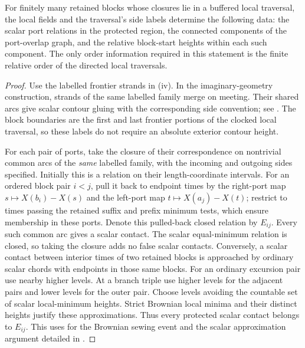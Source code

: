 \begin{lemma}\label{bg:local-ports}
For finitely many retained blocks whose closures lie in a buffered local traversal, the local fields and the traversal's side labels determine the following data: the scalar port relations in the protected region, the connected components of the port-overlap graph, and the relative block-start heights within each such component. The only order information required in this statement is the finite relative order of the directed local traversals.
\end{lemma}
\begin{proof}
Use the labelled frontier strands in (iv). In the imaginary-geometry construction, strands of the same labelled family merge on meeting. Their shared arcs give scalar contour gluing with the corresponding side convention; see \cite[Section~2.1.3 and Lemma~2.4]{GwynneMillerSheffieldHarmonic}. The block boundaries are the first and last frontier portions of the clocked local traversal, so these labels do not require an absolute exterior contour height.

For each pair of ports, take the closure of their correspondence on nontrivial common arcs of the \emph{same} labelled family, with the incoming and outgoing sides specified. Initially this is a relation on their length-coordinate intervals. For an ordered block pair \(i<j\), pull it back to endpoint times by the right-port map \(s\mapsto X(b_i)-X(s)\) and the left-port map \(t\mapsto X(a_j)-X(t)\); restrict to times passing the retained suffix and prefix minimum tests, which ensure membership in these ports. Denote this pulled-back closed relation by \(E_{ij}\). Every such common arc gives a scalar contact. The scalar equal-minimum relation is closed, so taking the closure adds no false scalar contacts. Conversely, a scalar contact between interior times of two retained blocks is approached by ordinary scalar chords with endpoints in those same blocks. For an ordinary excursion pair use nearby higher levels. At a branch triple use higher levels for the adjacent pairs and lower levels for the outer pair. Choose levels avoiding the countable set of scalar local-minimum heights. Strict Brownian local minima and their distinct heights justify these approximations. Thus every protected scalar contact belongs to \(E_{ij}\). This uses  for the Brownian sewing event and the scalar approximation argument detailed in .


\end{proof}
